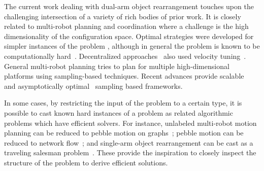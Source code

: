 %
The current work dealing with dual-arm object rearrangement touches upon the challenging intersection of a variety of rich bodies of prior work. It is closely related to multi-robot planning and coordination where a challenge is the high dimensionality of the configuration space. %
Optimal strategies were developed for simpler instances of the problem \cite{solovey2015motion}, although in general the problem is known to be computationally hard~\cite{solovey2016hardness}. Decentralized approaches~\cite{van2005prioritized} also used velocity tuning~\cite{leroy1999multiple}. General multi-robot planning tries to plan for multiple high-dimensional platforms \cite{wagner2012probabilistic,Gharbi:2009fu} using sampling-based techniques. 
Recent advances provide scalable~\cite{SoloveySH16:ijrr} and asymptotically optimal~\cite{Dobson:2017aa} sampling based frameworks. 


In some cases, by restricting the input of the problem to a certain type, it is possible to cast known hard instances of a problem as related algorithmic problems which have efficient solvers. For instance, unlabeled multi-robot motion planning can be reduced to pebble motion on graphs~\cite{abhs-unlabeled14}; pebble motion can be reduced to network flow~\cite{yu2016optimal}; and single-arm object rearrangement can be cast as a traveling salesman problem~\cite{193}. These provide the inspiration to closely inspect the structure of the problem to derive efficient solutions.


